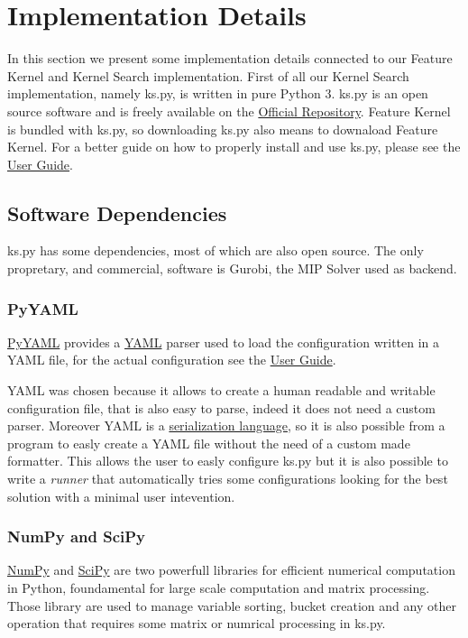 
\newcommand{\userguide}{see the \href{https://github.com/Optimization-Algorithms/User-Guide}{User Guide}}

\section{Implementation Details}
    In this section we present some implementation details connected to our Feature Kernel and Kernel Search implementation.  
    First of all our Kernel Search implementation, namely ks.py, is written in pure Python 3. ks.py is an open source software and
    is freely available on the \href{https://github.com/Optimization-Algorithms/ks.py}{Official Repository}. 
    Feature Kernel is bundled with ks.py, so downloading ks.py also means to downaload Feature Kernel. For a better guide on 
    how to properly install and use ks.py, please \userguide.

    \subsection{Software Dependencies}
        ks.py has some dependencies, most of which are also open source. The only propretary, and commercial, software is Gurobi, the MIP 
        Solver used as backend. 
        
        \subsubsection{PyYAML}
            \href{https://pyyaml.org/}{PyYAML} provides a \href{https://en.wikipedia.org/wiki/YAML}{YAML} parser used to load the configuration
            written in a YAML file, for the actual configuration \userguide.

            YAML was chosen because it allows to create a human readable and writable configuration file, that is also easy to parse, indeed it does not need a custom parser.
            Moreover YAML is a \href{https://en.wikipedia.org/wiki/Serialization}{serialization language}, so it is also possible from a program to easly create 
            a YAML file without the need of a custom made formatter. This allows the user to easly configure ks.py but it is also possible to write a \emph{runner} that
            automatically tries some configurations looking for the best solution with a minimal user intevention. 


        \subsubsection{NumPy and SciPy}
            \href{https://numpy.org/}{NumPy} and \href{https://www.scipy.org/scipylib/index.html}{SciPy} 
            are two powerfull libraries for efficient numerical computation in Python, foundamental for large scale computation and matrix processing. Those library
            are used to manage variable sorting, bucket creation and any other operation that requires some matrix or numrical processing in ks.py. 

